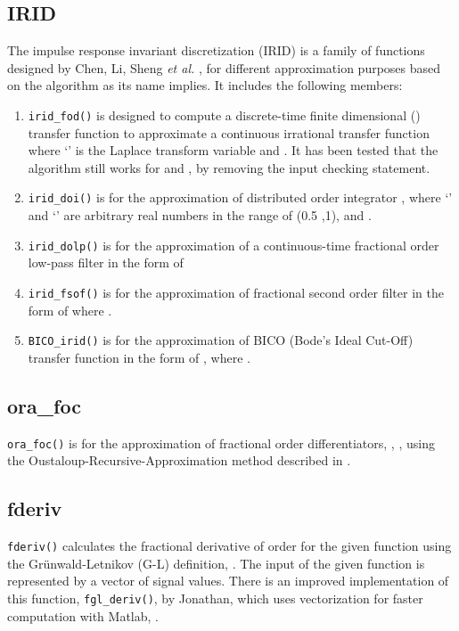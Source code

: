 \documentclass[11pt]{tCON2e}
\theoremstyle{plain}\newtheorem{theorem}{Theorem}
\theoremstyle{definition}
\theoremstyle{remark}
\begin{document}
\subsection{IRID}
The impulse response invariant discretization (IRID) is a family of functions designed by Chen, Li, Sheng \emph{et al.} \cite{ref:Liyan_irid, ref:Chen_irid_fod}, for different approximation purposes based on the algorithm as its name implies. It includes the following members:
\begin{enumerate}
    \item {\tt irid\_fod()} is designed to compute a discrete-time finite dimensional () transfer function to approximate a continuous irrational transfer
        function  where `' is the Laplace transform variable and . It has been tested that the algorithm still works for  and , by removing the input checking statement.
    \item {\tt irid\_doi()} is for the approximation of distributed order integrator , where `' and `' are arbitrary real numbers in the range of (0.5 ,1), and .
    \item {\tt irid\_dolp()} is for the approximation of a continuous-time fractional order low-pass filter in the form of 
    \item {\tt irid\_fsof()} is for the approximation of fractional second order filter in the form of  where .
    \item {\tt BICO\_irid()} is for the approximation of BICO (Bode's Ideal Cut-Off) transfer function in the form of , where .
\end{enumerate}




\subsection{ora\_foc}
{\tt ora\_foc()} is for the approximation of fractional order differentiators, , \cite{ref:Book_Xue_Chen_linear_feedback}, using the Oustaloup-Recursive-Approximation method described in \cite{ref:Oustaloup_ora}.





\subsection{fderiv}
{\tt fderiv()} calculates the fractional derivative of order  for the given function  using the Gr\"{u}nwald-Letnikov (G-L) definition, \cite{ref:Fractional_differentiator}. The input of the given function is represented by a vector of signal values.
There is an improved implementation of this function, {\tt fgl\_deriv()}, by Jonathan, which uses vectorization for faster computation with Matlab, \cite{ref:Fractional_derivative}.
\end{document}
